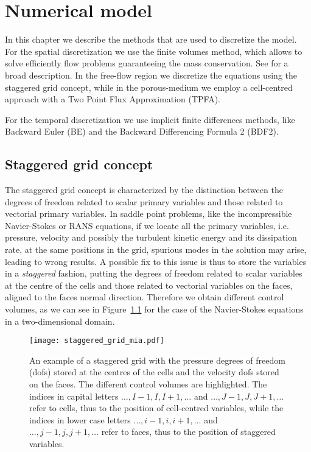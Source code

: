 \chapter{Numerical model} \label{chap:discretization} %
In this chapter we describe the methods that are used to discretize the model. 
For the spatial discretization we use the finite volumes method, which allows 
to solve efficiently flow problems guaranteeing the mass conservation. See 
\cite{fv:leveque} for a broad description.
In the free-flow region we discretize the equations using the staggered grid 
concept, while in the porous-medium we employ a cell-centred approach with a 
Two Point Flux Approximation (TPFA).

For the temporal discretization we use implicit finite differences methods, 
like Backward Euler (BE) and the Backward Differencing Formula 2 (BDF2).
%
\section{Staggered grid concept}
The staggered grid concept is characterized by the distinction between the 
degrees of freedom related to scalar primary variables and those related to 
vectorial primary variables. In saddle point problems, like the incompressible 
Navier-Stokes or RANS equations, if we locate all the primary variables, i.e. 
pressure, velocity and possibly the turbulent kinetic energy and its 
dissipation rate, at the same positions in the grid, spurious modes in the 
solution may arise, leading to wrong results. A possible fix to this issue 
is thus to store the variables in a \emph{staggered} fashion, putting 
the degrees of freedom related to scalar variables at the centre of the cells 
and those related to vectorial variables on the faces, aligned to the faces 
normal direction. Therefore we obtain different control volumes, as we can see 
in Figure~\ref{fig:staggrid} for the case of the 
Navier-Stokes equations in a two-dimensional domain.
\begin{figure}[t]
	\centering
	\texttt{[image: staggered\_grid\_mia.pdf]}
	\caption[Staggered grid control volumes]{An example of a staggered grid 
	with the pressure degrees of freedom (dofs) stored at the centres of the 
	cells and the velocity dofs stored on the faces. The different control 
	volumes are highlighted. The indices in capital letters 
	$\dots,I-1,I,I+1,\dots$ 
	and $\dots,J-1,J,J+1,\dots$ refer to cells, thus to the position of 
	cell-centred variables, while the indices in lower case letters 
	$\dots,i-1,i,i+1,\dots$ and $\dots,j-1,j,j+1,\dots$ refer to faces, thus to 
	the 
	position of staggered variables.}
	\label{fig:staggrid}
\end{figure}

